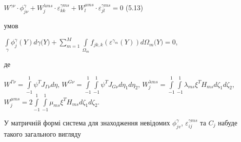 ${{W^{\gamma \nu} \cdot \phi_{\mathit{j\nu}}^{\gamma}} + {W_{j}^{\lambda\mathit{\text{ms}}} \cdot \varepsilon_{\mathit{\text{kk}}}^{\gamma\mathit{\text{ms}}}} + {W_{l}^{\mu\mathit{\text{ms}}} \cdot \varepsilon_{\mathit{\text{jl}}}^{\gamma\mathit{\text{ms}}}}} = 0$
(5.13)

\noindent умов

$\int\limits_{\gamma}{\phi_{j}^{\gamma}(Y)\mathit{d\gamma}(Y{) + {\sum\limits_{m = 1}^{M}{\int\limits_{\Omega_{m}}{f_{\mathit{\text{jk}},k}(\varepsilon^{\gamma_{m}}(Y))d\Omega_{m}{(Y{) = 0}}}}}}}$,

\noindent де

$W^{\mathit{\Gamma\nu}} = {\int\limits_{- 1}^{1}{\psi^{T}J_{\mathit{\Gamma\nu}}\mathit{d\eta}}}$,
$W^{\mathit{G\nu}} = {\int\limits_{- 1}^{1}{\int\limits_{- 1}^{1}{\psi^{T}J_{\mathit{G\nu}}\mathit{d\eta}_{1}\mathit{d\eta}_{2}}}}$,
$W_{j}^{\lambda\mathit{\text{ms}}} = {\int\limits_{- 1}^{1}{\int\limits_{- 1}^{1}{\lambda_{\mathit{\text{ms}}}\xi^{T}H_{\mathit{\text{ms}}}\mathit{d\zeta}_{1}\mathit{d\zeta}_{2}}}}$,
${W_{j}^{\mu\mathit{\text{ms}}} = 2}{\int\limits_{- 1}^{1}{\int\limits_{- 1}^{1}{\mu_{\mathit{\text{ms}}}\xi^{T}H_{\mathit{\text{ms}}}\mathit{d\zeta}_{1}\mathit{d\zeta}_{2}}}}$.

У матричній формі система для знаходження невідомих $\phi_{jv}^\gamma$, $\varepsilon_{ij}^{\gamma ms}$ та $C_j$ набуде
такого загального вигляду

